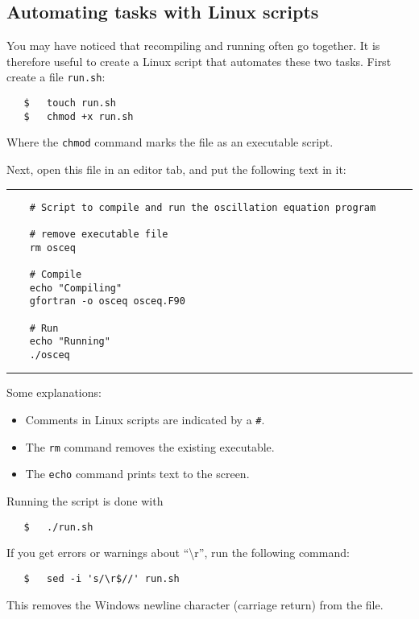 \documentclass[a4paper]{article}
\begin{document}
\subsection{Automating tasks with Linux scripts}
%
\par
You may have noticed that recompiling and running often go together. It is therefore useful to create a Linux script that automates these two tasks. First create a file \texttt{run.sh}:
%
\begin{verbatim}
   $   touch run.sh
   $   chmod +x run.sh
\end{verbatim}
%
Where the \verb+chmod+ command marks the file as an executable script.
%
\par
Next, open this file in an editor tab, and put the following text in it:
%
{\vspace{10pt}\hrule\small\vspace*{-2pt}\begin{verbatim}
    # Script to compile and run the oscillation equation program
    
    # remove executable file
    rm osceq
    
    # Compile
    echo "Compiling"
    gfortran -o osceq osceq.F90
    
    # Run
    echo "Running"
    ./osceq
\end{verbatim}\hrule\vspace{5pt}}
%
%
Some explanations:
%
\begin{itemize}
	\item Comments in Linux scripts are indicated by a \verb+#+.
	\item The \verb+rm+ command removes the existing executable.
	\item The \verb+echo+ command prints text to the screen.
\end{itemize}
%
\par
Running the script is done with
%
\begin{verbatim}
   $   ./run.sh
\end{verbatim}
%
\par
If you get errors or warnings about ``\textbackslash r'', run the following command:
%
\begin{verbatim}
   $   sed -i 's/\r$//' run.sh
\end{verbatim}
%
This removes the Windows newline character (carriage return) from the file.
%
\end{document}
